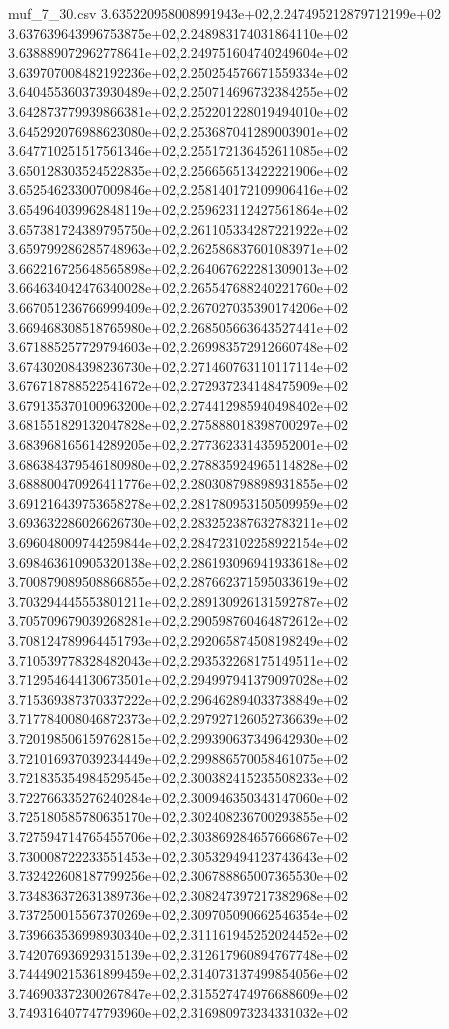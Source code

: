 \begin{filecontents*}{muf_7_30.csv}
3.635220958008991943e+02,2.247495212879712199e+02
3.637639643996753875e+02,2.248983174031864110e+02
3.638889072962778641e+02,2.249751604740249604e+02
3.639707008482192236e+02,2.250254576671559334e+02
3.640455360373930489e+02,2.250714696732384255e+02
3.642873779939866381e+02,2.252201228019494010e+02
3.645292076988623080e+02,2.253687041289003901e+02
3.647710251517561346e+02,2.255172136452611085e+02
3.650128303524522835e+02,2.256656513422221906e+02
3.652546233007009846e+02,2.258140172109906416e+02
3.654964039962848119e+02,2.259623112427561864e+02
3.657381724389795750e+02,2.261105334287221922e+02
3.659799286285748963e+02,2.262586837601083971e+02
3.662216725648565898e+02,2.264067622281309013e+02
3.664634042476340028e+02,2.265547688240221760e+02
3.667051236766999409e+02,2.267027035390174206e+02
3.669468308518765980e+02,2.268505663643527441e+02
3.671885257729794603e+02,2.269983572912660748e+02
3.674302084398236730e+02,2.271460763110117114e+02
3.676718788522541672e+02,2.272937234148475909e+02
3.679135370100963200e+02,2.274412985940498402e+02
3.681551829132047828e+02,2.275888018398700297e+02
3.683968165614289205e+02,2.277362331435952001e+02
3.686384379546180980e+02,2.278835924965114828e+02
3.688800470926411776e+02,2.280308798898931855e+02
3.691216439753658278e+02,2.281780953150509959e+02
3.693632286026626730e+02,2.283252387632783211e+02
3.696048009744259844e+02,2.284723102258922154e+02
3.698463610905320138e+02,2.286193096941933618e+02
3.700879089508866855e+02,2.287662371595033619e+02
3.703294445553801211e+02,2.289130926131592787e+02
3.705709679039268281e+02,2.290598760464872612e+02
3.708124789964451793e+02,2.292065874508198249e+02
3.710539778328482043e+02,2.293532268175149511e+02
3.712954644130673501e+02,2.294997941379097028e+02
3.715369387370337222e+02,2.296462894033738849e+02
3.717784008046872373e+02,2.297927126052736639e+02
3.720198506159762815e+02,2.299390637349642930e+02
3.721016937039234449e+02,2.299886570058461075e+02
3.721835354984529545e+02,2.300382415235508233e+02
3.722766335276240284e+02,2.300946350343147060e+02
3.725180585780635170e+02,2.302408236700293855e+02
3.727594714765455706e+02,2.303869284657666867e+02
3.730008722233551453e+02,2.305329494123743643e+02
3.732422608187799256e+02,2.306788865007365530e+02
3.734836372631389736e+02,2.308247397217382968e+02
3.737250015567370269e+02,2.309705090662546354e+02
3.739663536998930340e+02,2.311161945252024452e+02
3.742076936929315139e+02,2.312617960894767748e+02
3.744490215361899459e+02,2.314073137499854056e+02
3.746903372300267847e+02,2.315527474976688609e+02
3.749316407747793960e+02,2.316980973234331032e+02

\end{filecontents*}
